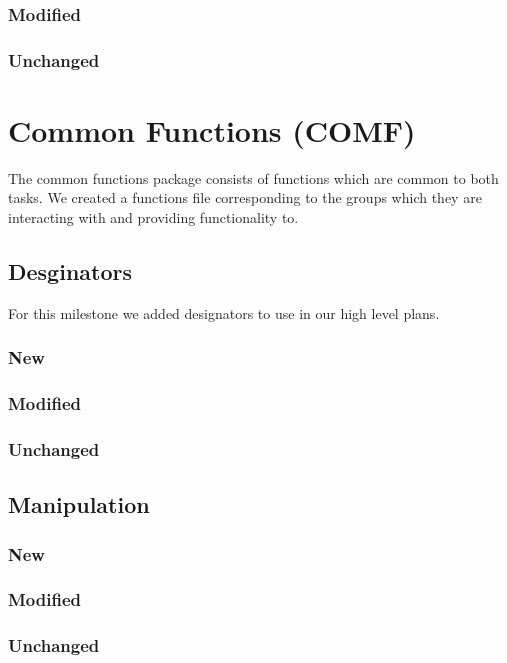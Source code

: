 \documentclass[main.tex]{subfiles}
\begin{document}
                \subsubsection{Modified}
                \subsubsection{Unchanged}

                
                \section{Common Functions (COMF)}
                The common functions package consists of functions which are common to both tasks. We created a functions file corresponding to the groups which they are interacting with and providing functionality to.
                \subsection{Desginators}
                For this milestone we added designators to use in our high level plans.
                \subsubsection{New}
                \subsubsection{Modified}
                \subsubsection{Unchanged}
                
                \subsection{Manipulation}
                \subsubsection{New}
                \subsubsection{Modified}
                \subsubsection{Unchanged}
                
\end{document}
